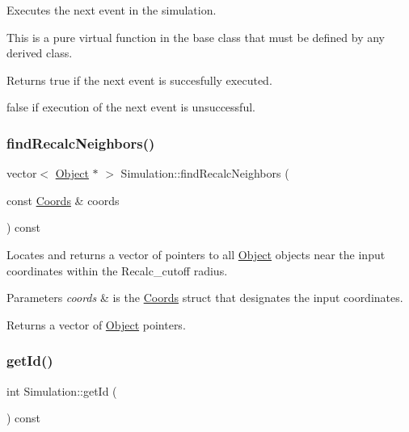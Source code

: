Executes the next event in the simulation. 

This is a pure virtual function in the base class that must be defined by any derived class. \begin{DoxyReturn}{Returns}
true if the next event is succesfully executed. 

false if execution of the next event is unsuccessful. 
\end{DoxyReturn}
\mbox{\label{class_simulation_aa6501dc60b4a3981f6ca44cec861364a}} 
\subsubsection{\texorpdfstring{find\+Recalc\+Neighbors()}{findRecalcNeighbors()}}
{\footnotesize\ttfamily vector$<$ \hyperlink{class_object}{Object} $\ast$ $>$ Simulation\+::find\+Recalc\+Neighbors (\begin{DoxyParamCaption}\item[{const \hyperlink{struct_coords}{Coords} \&}]{coords }\end{DoxyParamCaption}) const\hspace{0.3cm}{\ttfamily [protected]}}



Locates and returns a vector of pointers to all \hyperlink{class_object}{Object} objects near the input coordinates within the Recalc\+\_\+cutoff radius. 


\begin{DoxyParams}{Parameters}
{\em coords} & is the \hyperlink{struct_coords}{Coords} struct that designates the input coordinates. \\
\hline
\end{DoxyParams}
\begin{DoxyReturn}{Returns}
a vector of \hyperlink{class_object}{Object} pointers. 
\end{DoxyReturn}
\mbox{\label{class_simulation_aff40f268758bd9a0f390a649fc45c05e}} 
\subsubsection{\texorpdfstring{get\+Id()}{getId()}}
{\footnotesize\ttfamily int Simulation\+::get\+Id (\begin{DoxyParamCaption}{ }\end{DoxyParamCaption}) const}



